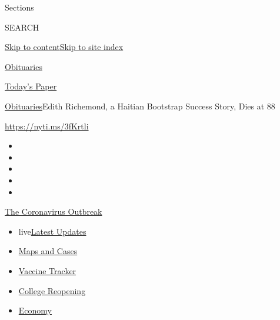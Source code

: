 Sections

SEARCH

\protect\hyperlink{site-content}{Skip to
content}\protect\hyperlink{site-index}{Skip to site index}

\href{https://www.nytimes.com/section/obituaries}{Obituaries}

\href{https://myaccount.nytimes.com/auth/login?response_type=cookie\&client_id=vi}{}

\href{https://www.nytimes.com/section/todayspaper}{Today's Paper}

\href{/section/obituaries}{Obituaries}\textbar{}Edith Richemond, a
Haitian Bootstrap Success Story, Dies at 88

\url{https://nyti.ms/3fKrtli}

\begin{itemize}
\item
\item
\item
\item
\item
\end{itemize}

\href{https://www.nytimes.com/news-event/coronavirus?action=click\&pgtype=Article\&state=default\&region=TOP_BANNER\&context=storylines_menu}{The
Coronavirus Outbreak}

\begin{itemize}
\tightlist
\item
  live\href{https://www.nytimes.com/2020/08/03/world/coronavirus-covid-19.html?action=click\&pgtype=Article\&state=default\&region=TOP_BANNER\&context=storylines_menu}{Latest
  Updates}
\item
  \href{https://www.nytimes.com/interactive/2020/us/coronavirus-us-cases.html?action=click\&pgtype=Article\&state=default\&region=TOP_BANNER\&context=storylines_menu}{Maps
  and Cases}
\item
  \href{https://www.nytimes.com/interactive/2020/science/coronavirus-vaccine-tracker.html?action=click\&pgtype=Article\&state=default\&region=TOP_BANNER\&context=storylines_menu}{Vaccine
  Tracker}
\item
  \href{https://www.nytimes.com/2020/08/02/us/covid-college-reopening.html?action=click\&pgtype=Article\&state=default\&region=TOP_BANNER\&context=storylines_menu}{College
  Reopening}
\item
  \href{https://www.nytimes.com/live/2020/08/03/business/stock-market-today-coronavirus?action=click\&pgtype=Article\&state=default\&region=TOP_BANNER\&context=storylines_menu}{Economy}
\end{itemize}

